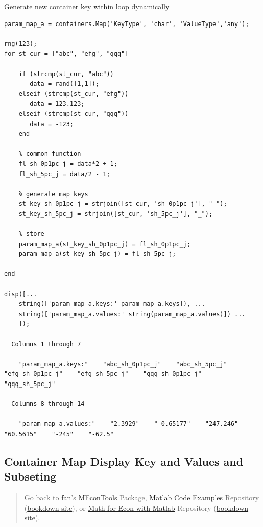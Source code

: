 \documentclass[
]{book}
\begin{document}
Generate new container key within loop dynamically

\begin{verbatim}
param_map_a = containers.Map('KeyType', 'char', 'ValueType','any');

rng(123);
for st_cur = ["abc", "efg", "qqq"]

    if (strcmp(st_cur, "abc"))
       data = rand([1,1]);
    elseif (strcmp(st_cur, "efg"))
       data = 123.123;
    elseif (strcmp(st_cur, "qqq"))
       data = -123;
    end

    % common function
    fl_sh_0p1pc_j = data*2 + 1;
    fl_sh_5pc_j = data/2 - 1;

    % generate map keys
    st_key_sh_0p1pc_j = strjoin([st_cur, 'sh_0p1pc_j'], "_");
    st_key_sh_5pc_j = strjoin([st_cur, 'sh_5pc_j'], "_");

    % store
    param_map_a(st_key_sh_0p1pc_j) = fl_sh_0p1pc_j;
    param_map_a(st_key_sh_5pc_j) = fl_sh_5pc_j;

end

disp([...
    string(['param_map_a.keys:' param_map_a.keys]), ...
    string(['param_map_a.values:' string(param_map_a.values)]) ...
    ]);

  Columns 1 through 7

    "param_map_a.keys:"    "abc_sh_0p1pc_j"    "abc_sh_5pc_j"    "efg_sh_0p1pc_j"    "efg_sh_5pc_j"    "qqq_sh_0p1pc_j"    "qqq_sh_5pc_j"

  Columns 8 through 14

    "param_map_a.values:"    "2.3929"    "-0.65177"    "247.246"    "60.5615"    "-245"    "-62.5"
\end{verbatim}

\hypertarget{container-map-display-key-and-values-and-subseting}{%
\subsection{Container Map Display Key and Values and Subseting}\label{container-map-display-key-and-values-and-subseting}}

\begin{quote}
Go back to \href{http://fanwangecon.github.io/}{fan}'s \href{https://fanwangecon.github.io/MEconTools/}{MEconTools} Package, \href{https://fanwangecon.github.io/M4Econ/}{Matlab Code Examples} Repository (\href{https://fanwangecon.github.io/M4Econ/bookdown}{bookdown site}), or \href{https://fanwangecon.github.io/Math4Econ/}{Math for Econ with Matlab} Repository (\href{https://fanwangecon.github.io/Math4Econ/bookdown}{bookdown site}).
\end{quote}
\end{document}
